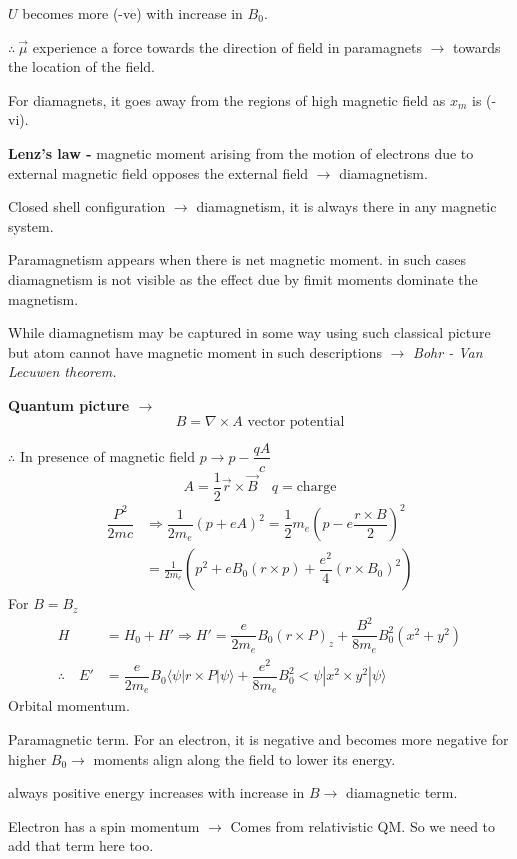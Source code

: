 $U$ becomes more (-ve) with increase in $B_{0}$.

$\therefore \ \overrightarrow{\mu}$ experience a force towards the direction of field in paramagnets $\to$ towards the location of the field.

For diamagnets, it goes away from the regions of high magnetic field as $x_{m}$ is (-vi).

{\bf Lenz's law - } magnetic moment arising from the motion of electrons due to external magnetic field opposes the external field $\to$ diamagnetism.

Closed shell configuration $\to$ diamagnetism, it is always there in any magnetic system.

Paramagnetism appears when there is net magnetic moment. in such cases diamagnetism is not visible as the effect due by fimit moments dominate the magnetism.

While diamagnetism may be captured in some way using such classical picture but atom cannot have magnetic moment in such descriptions $\to$ {\em Bohr - Van Lecuwen theorem.}

\noindent
{\bf Quantum picture $\to$}
$$
B=\nabla \times A \text{ \ vector potential}
$$

$\therefore$ In presence of magnetic field $p\to p-\dfrac{qA}{c}$
$$
A=\dfrac{1}{2}\overrightarrow{r}\times \overrightarrow{B}\quad q=\text{charge}
$$
\begin{align*}
\dfrac{P^{2}}{2mc} &\Rightarrow \dfrac{1}{2m_{e}}(p+eA)^{2}=\dfrac{1}{2}m_{e}\left(p-e\dfrac{r\times B}{2}\right)^{2}\\
&= \frac{1}{2m_{e}}\left(p^{2}+eB_{0}(r\times p)+\dfrac{e^{2}}{4}(r\times B_{0})^{2}\right)
\end{align*}
For $B=B_{z}$
\begin{align*}
H &= H_{0}+H'\Rightarrow H'=\dfrac{e}{2m_{e}}B_{0}(r\times P)_{z}+\dfrac{B^{2}}{8m_{e}}B^{2}_{0}(x^{2}+y^{2})\\
\therefore\quad E' &= \dfrac{e}{2m_{e}}B_{0}\langle \psi|r\times P|\psi\rangle +\dfrac{e^{2}}{8m_{e}}B^{2}_{0}<\psi |x^{2}\times y^{2}|\psi\rangle
\end{align*}
Orbital momentum.

Paramagnetic term. For an electron, it is negative and becomes more negative for higher $B_{0} \to$ moments align along the field to lower its energy.

always positive energy increases with increase in $B\to$ diamagnetic term.


Electron has a spin momentum $\to$ Comes from relativistic QM. So we need to add that term here too.

